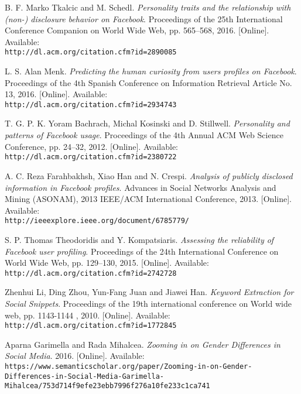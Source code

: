\documentclass[a4paper,oneside,11pt]{report}
\begin{document}
\begin{thebibliography}{9}

B. F. Marko Tkalcic and M. Schedl. 
\textit{Personality traits and the relationship with (non-) disclosure behavior on Facebook}. 
Proceedings of the 25th International Conference Companion on World Wide Web, pp. 565–568, 2016. [Online]. Available: 
\\\texttt{http://dl.acm.org/citation.cfm?id=2890085}

L. S. Alan Menk. 
\textit{Predicting the human curiosity from users profiles on Facebook}. 
Proceedings of the 4th Spanish Conference on Information Retrieval Article No. 13, 2016. [Online]. Available: 
\\\texttt{http://dl.acm.org/citation.cfm?id=2934743}

T. G. P. K. Yoram Bachrach, Michal Kosinski and D. Stillwell.
\textit{Personality and patterns of Facebook usage}. 
Proceedings of the 4th Annual ACM Web Science Conference, pp. 24–32, 2012. [Online]. Available:
\\\texttt{http://dl.acm.org/citation.cfm?id=2380722}

A. C. Reza Farahbakhsh, Xiao Han and N. Crespi. 
\textit{Analysis of publicly disclosed information in Facebook profiles}. 
Advances in Social Networks Analysis and Mining (ASONAM), 2013 IEEE/ACM International Conference, 2013. [Online]. Available:
\\\texttt{http://ieeexplore.ieee.org/document/6785779/}

S. P. Thomas Theodoridis and Y. Kompatsiaris. 
\textit{Assessing the reliability of Facebook user profiling}. 
Proceedings of the 24th International Conference on World Wide Web, pp. 129–130, 2015. [Online]. Available:
\\\texttt{http://dl.acm.org/citation.cfm?id=2742728}

Zhenhui Li, Ding Zhou, Yun-Fang Juan and Jiawei Han. 
\textit{Keyword Extraction for Social Snippets}. 
Proceedings of the 19th international conference on World wide web, pp. 1143-1144 , 2010. [Online]. Available:
\\\texttt{http://dl.acm.org/citation.cfm?id=1772845}

Aparna Garimella and Rada Mihalcea. 
\textit{Zooming in on Gender Differences in Social Media}. 
2016. [Online]. Available:
\\\texttt{https://www.semanticscholar.org/paper/Zooming-in-on-Gender-Differences-in-Social-Media-Garimella-Mihalcea/753d714f9efe23ebb7996f276a10fe233c1ca741}


\end{thebibliography}
\end{document}
